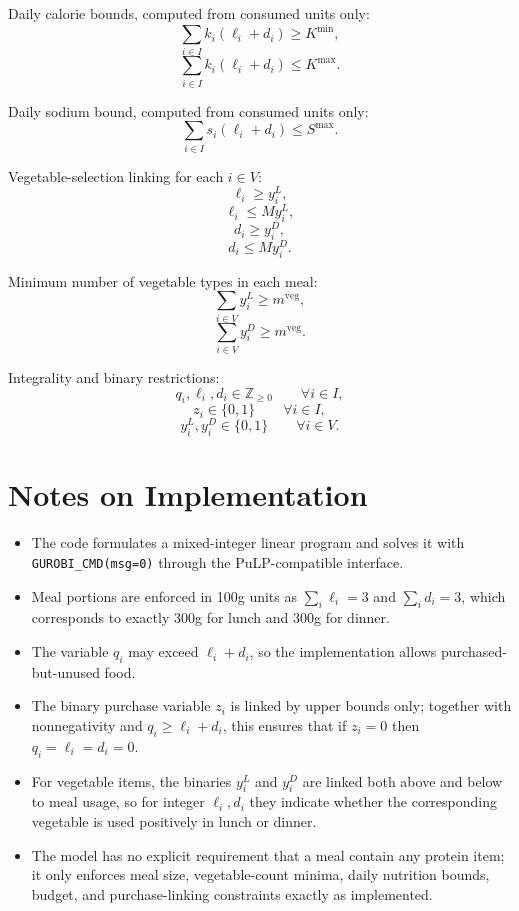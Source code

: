 Daily calorie bounds, computed from consumed units only:
\[
\sum_{i \in I} k_i(\ell_i + d_i) \ge K^{\min},
\]
\[
\sum_{i \in I} k_i(\ell_i + d_i) \le K^{\max}.
\]

Daily sodium bound, computed from consumed units only:
\[
\sum_{i \in I} s_i(\ell_i + d_i) \le S^{\max}.
\]

Vegetable-selection linking for each $i \in V$:
\[
\ell_i \ge y_i^L,
\]
\[
\ell_i \le M y_i^L,
\]
\[
d_i \ge y_i^D,
\]
\[
d_i \le M y_i^D.
\]

Minimum number of vegetable types in each meal:
\[
\sum_{i \in V} y_i^L \ge m^{\mathrm{veg}},
\]
\[
\sum_{i \in V} y_i^D \ge m^{\mathrm{veg}}.
\]

Integrality and binary restrictions:
\[
q_i,\ell_i,d_i \in \mathbb{Z}_{\ge 0} \qquad \forall i \in I,
\]
\[
z_i \in \{0,1\} \qquad \forall i \in I,
\]
\[
y_i^L,y_i^D \in \{0,1\} \qquad \forall i \in V.
\]

\section*{Notes on Implementation}

\begin{itemize}
    \item The code formulates a mixed-integer linear program and solves it with \texttt{GUROBI\_CMD(msg=0)} through the PuLP-compatible interface.
    \item Meal portions are enforced in 100g units as $\sum_i \ell_i = 3$ and $\sum_i d_i = 3$, which corresponds to exactly 300g for lunch and 300g for dinner.
    \item The variable $q_i$ may exceed $\ell_i+d_i$, so the implementation allows purchased-but-unused food.
    \item The binary purchase variable $z_i$ is linked by upper bounds only; together with nonnegativity and $q_i \ge \ell_i+d_i$, this ensures that if $z_i=0$ then $q_i=\ell_i=d_i=0$.
    \item For vegetable items, the binaries $y_i^L$ and $y_i^D$ are linked both above and below to meal usage, so for integer $\ell_i,d_i$ they indicate whether the corresponding vegetable is used positively in lunch or dinner.
    \item The model has no explicit requirement that a meal contain any protein item; it only enforces meal size, vegetable-count minima, daily nutrition bounds, budget, and purchase-linking constraints exactly as implemented.
\end{itemize}
